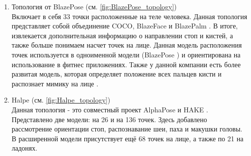 \begin{enumerate}
 \item Топология от BlazePose (см. \autoref{fig:BlazePose_topology})\\
 Включает в себя 33 точки расположенные на теле человека. Данная топология представляет собой объединение COCO, BlazeFace \cite{BlazeFace} и BlazePalm \cite{Hands}. В итоге, извлекается дополнительная информацию о направлении стоп и кистей, а также больше понимаем насчет точек на лице. Данная модель расположения точек используется в одноименной модели (BlazePose \cite{BlazePose}) и ориентирована на использование в фитнес приложениях. Также у данной компании есть более развитая модель, которая определяет положение всех пальцев кисти и распознает мимику на лице \cite{Holistic}.
 \item Halpe (см. \autoref{fig:Halpe_topology})\\
 Данная топология - это совместный проект AlphaPose \cite{fang2017rmpe} и HAKE \cite{li2020pastanet}. Представлено две модели: на 26 и на 136 точек. Здесь добавлено рассмотрение ориентации стоп, распознавание шеи, паха и макушки головы. В расширенной модели присутствует ещё 68 точек на лице, а также по 21 на ладонях.
\end{enumerate}

